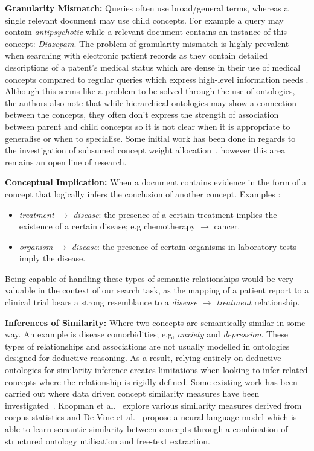 \documentclass[a4paper]{report}
\begin{document}
\textbf{Granularity Mismatch:}
Queries often use broad/general terms, whereas a single relevant document may use child concepts. For example a query may contain \textit{antipsychotic} while a relevant document contains an instance of this concept: \textit{Diazepam}. The problem of granularity mismatch is highly prevalent when searching with electronic patient records as they contain detailed descriptions of a patent's medical status which are dense in their use of medical concepts compared to regular queries which express high-level information needs \cite{quteprints72853}. Although this seems like a problem to be solved through the use of ontologies, the authors also note that while hierarchical ontologies may show a connection between the concepts, they often don't express the strength of association between parent and child concepts so it is not clear when it is appropriate to generalise or when to specialise. Some initial work has been done in regards to the investigation of subsumed concept weight allocation~\cite{Zuccon:2012:EMH:2407085.2407100}, however this area remains an open line of research.

 
\textbf{Conceptual Implication:}
When a document contains evidence in the form of a concept that logically infers the conclusion of another concept. Examples \cite{quteprints72853}:
  \begin{itemize}
    \item \textit{treatment $\rightarrow$ disease}: the presence of a certain treatment implies the existence of a certain disease; e.g chemotherapy $\rightarrow$ cancer.
    \item \textit{organism $\rightarrow$ disease}: the presence of certain organisms in laboratory tests imply the disease.
  \end{itemize}
Being capable of handling these types of semantic relationships would be very valuable in the context of our search task, as the mapping of a patient report to a clinical trial bears a strong resemblance to a \textit{disease $\rightarrow$ treatment} relationship.
  
\textbf{Inferences of Similarity:}
Where two concepts are semantically similar in some way. An example is disease comorbidities; e.g, \textit{anxiety} and \textit{depression}. These types of relationships and associations are not usually modelled in ontologies designed for deductive reasoning. As a result, relying entirely on deductive ontologies for similarity inference creates limitations when looking to infer related concepts where the relationship is rigidly defined. Some existing work has been carried out where data driven concept similarity measures have been investigated~\cite{Koopman:2012:ECM:2396761.2398661, DeVine:2014:MSS:2661829.2661974}. Koopman et al.~\cite{Koopman:2012:ECM:2396761.2398661} explore various similarity measures derived from corpus statistics and De Vine et al.~\cite{DeVine:2014:MSS:2661829.2661974} propose a neural language model which is able to learn semantic similarity between concepts through a combination of structured ontology utilisation and free-text extraction.
\end{document}
